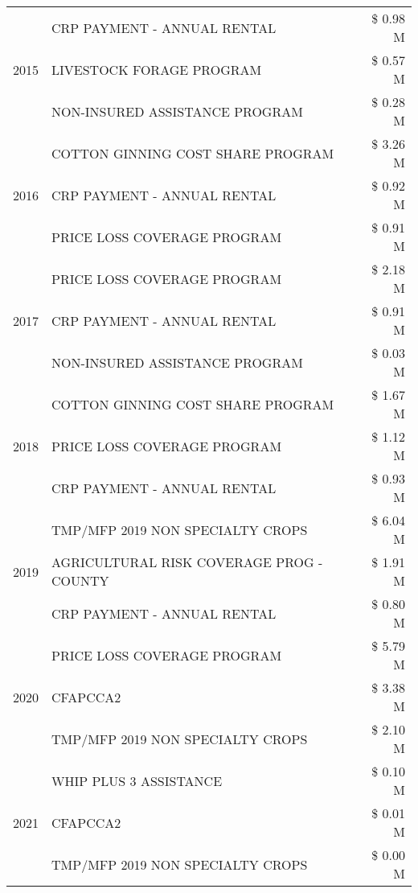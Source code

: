 \begin{tabular}{llr}
\cline{1-3}
\multirow[t]{3}{*}{2015} & CRP PAYMENT - ANNUAL RENTAL & \$ 0.98 M \\
 & LIVESTOCK FORAGE PROGRAM & \$ 0.57 M \\
 & NON-INSURED ASSISTANCE PROGRAM & \$ 0.28 M \\
\cline{1-3}
\multirow[t]{3}{*}{2016} & COTTON GINNING COST SHARE PROGRAM & \$ 3.26 M \\
 & CRP PAYMENT - ANNUAL RENTAL & \$ 0.92 M \\
 & PRICE LOSS COVERAGE PROGRAM & \$ 0.91 M \\
\cline{1-3}
\multirow[t]{3}{*}{2017} & PRICE LOSS COVERAGE PROGRAM & \$ 2.18 M \\
 & CRP PAYMENT - ANNUAL RENTAL & \$ 0.91 M \\
 & NON-INSURED ASSISTANCE PROGRAM & \$ 0.03 M \\
\cline{1-3}
\multirow[t]{3}{*}{2018} & COTTON GINNING COST SHARE PROGRAM & \$ 1.67 M \\
 & PRICE LOSS COVERAGE PROGRAM & \$ 1.12 M \\
 & CRP PAYMENT - ANNUAL RENTAL & \$ 0.93 M \\
\cline{1-3}
\multirow[t]{3}{*}{2019} & TMP/MFP 2019 NON SPECIALTY CROPS & \$ 6.04 M \\
 & AGRICULTURAL RISK COVERAGE PROG - COUNTY & \$ 1.91 M \\
 & CRP PAYMENT - ANNUAL RENTAL & \$ 0.80 M \\
\cline{1-3}
\multirow[t]{3}{*}{2020} & PRICE LOSS COVERAGE PROGRAM & \$ 5.79 M \\
 & CFAPCCA2 & \$ 3.38 M \\
 & TMP/MFP 2019 NON SPECIALTY CROPS & \$ 2.10 M \\
\cline{1-3}
\multirow[t]{3}{*}{2021} & WHIP PLUS 3 ASSISTANCE & \$ 0.10 M \\
 & CFAPCCA2 & \$ 0.01 M \\
 & TMP/MFP 2019 NON SPECIALTY CROPS & \$ 0.00 M \\
\cline{1-3}
\bottomrule
\end{tabular}
